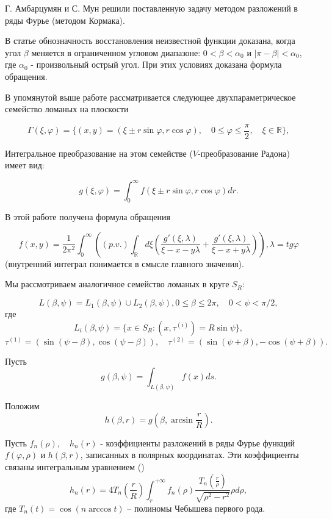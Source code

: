 Г. Амбарцумян и С. Мун \cite{mzg-Ambartsoumian1} решили поставленную задачу методом разложений в ряды Фурье (методом Кормака).

В статье \cite{mzg-Medzhidov2} обнозначность восстановления неизвестной функции доказана, когда угол $\beta$ меняется в ограниченном угловом диапазоне: $0<\beta<\alpha_0$ и $|\pi-\beta|<\alpha_0$, где $\alpha_0$ - произвольный острый угол. При этих условиях доказана формула обращения.

В упомянутой выше работе \cite{mzg-Truong} рассматривается следующее двухпараметрическое семейство ломаных на плоскости

\begin{equation}
\label{mzg-eq-one4}
\Gamma(\xi,\varphi)=\{(x,y)=(\xi\pm r \sin \varphi, r \cos \varphi),\quad 0\leq\varphi\leq\frac{\pi}{2}, \quad \xi\in\mathbb R\},
\end{equation}

Интегральное преобразование на этом семействе ($V$-преобразование Радона) имеет вид:

$$g(\xi,\varphi)=\int_0^\infty f(\xi\pm r \sin \varphi, r \cos \varphi)dr.$$

В этой работе получена формула обращения

$$f(x,y)=\frac{1}{2\pi^2}\int_0^\infty \left( (p.v.)\int_\mathbb R d\xi\left(\frac{g'(\xi,\lambda)}{\xi-x-y\lambda}+\frac{g'(\xi,\lambda)}{\xi-x+y\lambda}\right)\right), \lambda=tg \varphi$$
(внутренний интеграл понимается в смысле главного значения).

Мы рассмотриваем аналогичное семейство ломаных в круге $S_R$:

$$L(\beta,\psi)=L_1(\beta,\psi)\cup L_2(\beta,\psi), 0\leq \beta\leq2\pi,\quad 0<\psi<\pi/2,$$
где
$$L_i(\beta,\psi)=\{x\in S_R:(x,\tau^{(i)})=R \sin \psi\},$$
$$\tau^{(1)}=(\sin(\psi-\beta), \cos(\psi-\beta)),\quad \tau^{(2)}=(\sin(\psi+\beta), -\cos(\psi+\beta)).$$

Пусть
$$g(\beta,\psi)=\int_{L(\beta,\psi)}f(x)ds.$$

Положим
$$h(\beta,r)=g\left(\beta, \arcsin \frac{r}{R}\right).$$

Пусть $f_n(\rho), \quad h_n(r)$ - коэффициенты разложений в ряды Фурье функций $f(\varphi,\rho)$ и $h(\beta,r)$, записанных в полярных координатах.
Эти коэффициенты связаны интегральным уравнением (\cite{mzg-Medzhidov1})
$$h_n(r)=4T_n\left(\frac{r}{R}\right)\int_r^{+\infty}f_n(\rho)\frac{T_n\left(\frac{r}{\rho}\right)}{\sqrt{\rho^2-r^2}}\rho d\rho,$$
где $T_n(t)=\cos (n \arccos t)$ -- полиномы Чебышева первого рода.

